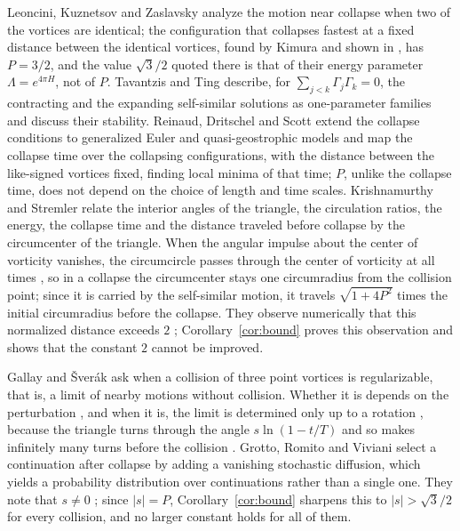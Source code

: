 \documentclass[11pt]{article}
\theoremstyle{definition}
\begin{document}
Leoncini, Kuznetsov and Zaslavsky \cite{lkz2000} analyze the motion near collapse when two of the vortices are identical; the configuration that collapses fastest at a fixed distance between the identical vortices, found by Kimura \cite[Eq.~(4.6)]{kimura1987} and shown in \cite[Fig.~18]{lkz2000}, has $P = 3/2$, and the value $\sqrt{3}/2$ quoted there is that of their energy parameter $\Lambda = e^{4\pi H}$, not of $P$. Tavantzis and Ting \cite{tt1988} describe, for $\sum_{j<k} \Gamma_j \Gamma_k = 0$, the contracting and the expanding self-similar solutions as one-parameter families and discuss their stability. Reinaud, Dritschel and Scott \cite{rds2022} extend the collapse conditions to generalized Euler and quasi-geostrophic models and map the collapse time over the collapsing configurations, with the distance between the like-signed vortices fixed, finding local minima of that time; $P$, unlike the collapse time, does not depend on the choice of length and time scales. Krishnamurthy and Stremler \cite{ks2018} relate the interior angles of the triangle, the circulation ratios, the energy, the collapse time and the distance traveled before collapse by the circumcenter of the triangle. When the angular impulse about the center of vorticity vanishes, the circumcircle passes through the center of vorticity at all times \cite[Eq.~(40)]{kas2018}, so in a collapse the circumcenter stays one circumradius from the collision point; since it is carried by the self-similar motion, it travels $\sqrt{1 + 4P^2}$ times the initial circumradius before the collapse. They observe numerically that this normalized distance exceeds $2$ \cite[Sect.~3.5]{ks2018}; Corollary~\ref{cor:bound} proves this observation and shows that the constant $2$ cannot be improved.

Gallay and \v{S}ver\'ak \cite{gallay2026} ask when a collision of three point vortices is regularizable, that is, a limit of nearby motions without collision. Whether it is depends on the perturbation \cite[Theorems~5.8, 5.10, 5.15]{gallay2026}, and when it is, the limit is determined only up to a rotation \cite[Sect.~1]{gallay2026}, because the triangle turns through the angle $s \ln(1 - t/T)$ and so makes infinitely many turns before the collision \cite[Sect.~5.2]{gallay2026}. Grotto, Romito and Viviani \cite{grv2023} select a continuation after collapse by adding a vanishing stochastic diffusion, which yields a probability distribution over continuations rather than a single one. They note that $s \neq 0$ \cite[Remark~E.2]{gallay2026}; since $|s| = P$, Corollary~\ref{cor:bound} sharpens this to $|s| > \sqrt{3}/2$ for every collision, and no larger constant holds for all of them.
\end{document}
